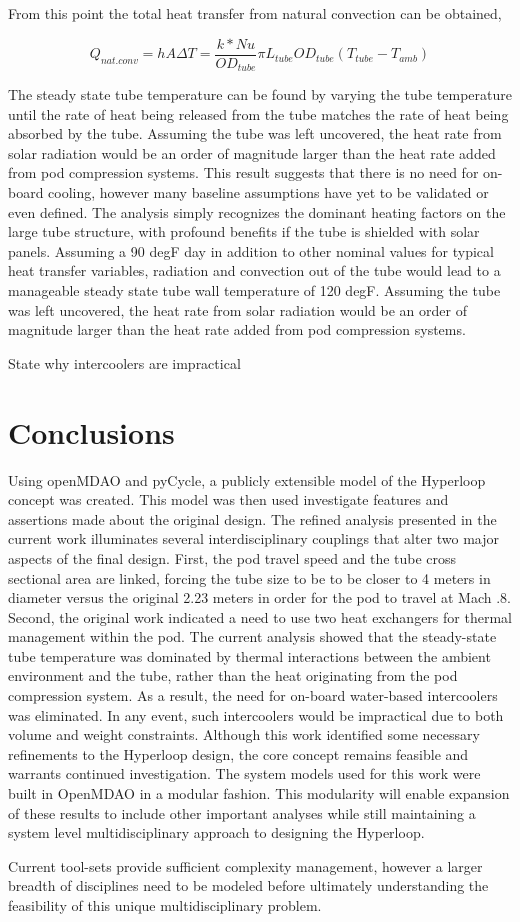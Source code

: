 \documentclass[heading.tex]{subfiles}
\begin{document}
From this point the total heat transfer from natural convection can be obtained,

\begin{equation}
Q_{nat. conv} = hA \Delta T = \frac{k*Nu}{ {OD}_{tube}} \pi {L}_{tube} {OD}_{tube} (T_{tube}-T_{amb})
\end{equation}

The steady state tube temperature can be found by varying the tube temperature until the rate of heat being released from the tube
matches the rate of heat being absorbed by the tube.
Assuming the tube was left uncovered, the heat rate from solar radiation would be an order of magnitude larger than the heat
rate added from pod compression systems.
This result suggests that there is no need for on-board cooling, however many baseline assumptions have yet to be validated or even defined.
The analysis simply recognizes the dominant heating factors on the large tube structure, with profound benefits if the tube is shielded with solar panels.
Assuming a 90 degF day in addition to other nominal values for typical heat transfer variables,
radiation and convection out of the tube would lead to a manageable steady state tube wall temperature of 120 degF. 
Assuming the tube was left uncovered, the heat rate from solar radiation would be an order of magnitude larger than the heat rate added from pod compression systems.

State why intercoolers are impractical

\section{Conclusions}

Using openMDAO and pyCycle, a publicly extensible model of the Hyperloop concept was created.
This model was then used investigate features and assertions made about the original design. 
The refined analysis presented in the current work illuminates several
interdisciplinary couplings that alter two major aspects of the final design.
First, the pod travel speed and the tube cross sectional area are linked, forcing 
the tube size to be to be closer to 4 meters in diameter versus the original 2.23 meters in order for the 
pod to travel at Mach .8. Second, the original work indicated a need to use two heat exchangers for thermal management within the pod.
The current analysis showed that the steady-state tube temperature was dominated by thermal interactions between
the ambient environment and the tube, rather than the heat originating from the pod compression system.
As a result, the need for on-board water-based intercoolers was eliminated.
In any event, such intercoolers would be impractical due to both volume and weight constraints. 
Although this work identified some necessary refinements to the Hyperloop design, the core 
concept remains feasible and warrants continued investigation. 
The system models used for this work were built in OpenMDAO in a modular fashion. 
This modularity will enable expansion of these results to include other important analyses 
while still maintaining a system level multidisciplinary approach to designing the Hyperloop.  

Current tool-sets provide sufficient complexity management, however a larger breadth of disciplines need to be modeled before ultimately
understanding the feasibility of this unique multidisciplinary problem.
\end{document}
